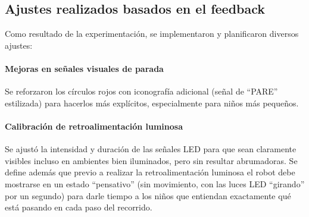 \documentclass{prgrado}
\begin{document}
\subsection{Ajustes realizados basados en el feedback}
Como resultado de la experimentación, se implementaron y planificaron diversos ajustes:

\paragraph{Mejoras en señales visuales de parada} Se reforzaron los círculos rojos con iconografía adicional (señal de ``PARE'' estilizada) para hacerlos más explícitos, especialmente para niños más pequeños.
\paragraph{Calibración de retroalimentación luminosa} Se ajustó la intensidad y duración de las señales LED para que sean claramente visibles incluso en ambientes bien iluminados, pero sin resultar abrumadoras. Se define además que previo a realizar la retroalimentación luminosa el robot debe mostrarse en un estado ``pensativo'' (sin movimiento, con las luces LED ``girando'' por un segundo) para darle tiempo a los niños que entiendan exactamente qué está pasando en cada paso del recorrido.
\end{document}
